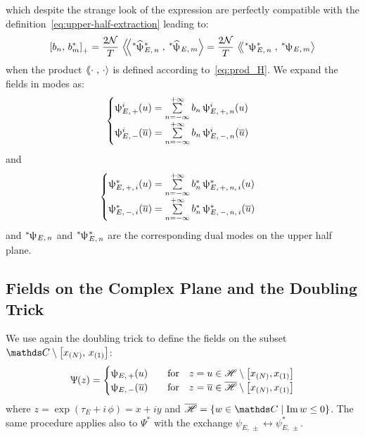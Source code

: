which despite the strange look of the expression are perfectly compatible with the definition~\eqref{eq:upper-half-extraction} leading to:
\begin{equation}
  \liebraket{b_n}{b^*_m}_+
  =
  \frac{2 \cN}{T}\,
  \lconsprod{\dual{\hpsi}^*_{E,\, n}}{\dual{\hpsi}_{E,\, m}}
  =
  \frac{2 \cN}{T}\,
  \lconsprod{\dual{\psi}^*_{E,\, n}}{\dual{\psi}_{E,\, m}}
\end{equation}
when the product $\left\langle\hspace{-0.25em}\left\langle \cdot\right.,\, \cdot \right\rangle$ is defined according to~\eqref{eq:prod_H}.
We expand the fields in modes as:
\begin{equation}
  \begin{cases}
    \uppsi^i_{E,\, +}(u)
    =
    \sum\limits_{n = -\infty}^{+\infty} b_n\, \uppsi^i_{E,\, +,\, n}(u)
    \\
    \uppsi^i_{E,\, -}(\overline{u})
    =
    \sum\limits_{n = -\infty}^{+\infty} b_n\, \uppsi^i_{E,\, -,\, n}(\overline{u})
  \end{cases}
\end{equation}
and
\begin{equation}
  \begin{cases}
    \uppsi^*_{E,\, +,\, i}(u)
    =
    \sum\limits_{n = -\infty}^{+\infty} b^*_n\, \uppsi^*_{E,\, +,\, n,\, i}(u)
    \\
    \uppsi^*_{E,\, -,\, i}(\overline{u})
    =
    \sum\limits_{n = -\infty}^{+\infty} b^*_n\, \uppsi^*_{E,\, -,\, n,\, i}(\overline{u})
  \end{cases}
\end{equation}
and $\dual{\psi}_{E,\, n}$ and $\dual{\psi}^*_{E,\, n}$ are the corresponding dual modes on the upper half plane.   


\subsection{Fields on the Complex Plane and the Doubling Trick}
  
We use again the doubling trick to define the fields on the subset $\C \setminus \qty[ x_{(N)},\, x_{(1)} ]$:
\begin{equation}
  \Psi( z )
  =
  \begin{cases}
    \psi_{E,\, +}(u)
    & \qfor
    z = u \in \ccH \setminus \qty[ x_{(N)}, x_{(1)} ]
    \\
    \psi_{E,\, -}(\baru)
    & \qfor
    z = \baru \in \overline{\ccH} \setminus \qty[ x_{(N)}, x_{(1)} ]
  \end{cases}
\end{equation}
where $z = \exp( \tau_E + i\, \phi ) = x + i y$ and $\overline{\ccH} = \qty{ w \in \C \mid \Im w \le 0 }$.
The same procedure applies also to $\Psi^*$ with the exchange $\psi_{E,\, \pm} \leftrightarrow \psi_{E,\, \pm}^*$.

